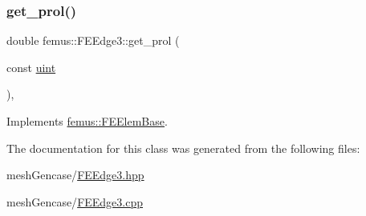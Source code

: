 \subsubsection{\texorpdfstring{get\+\_\+prol()}{get\_prol()}}
{\footnotesize\ttfamily double femus\+::\+F\+E\+Edge3\+::get\+\_\+prol (\begin{DoxyParamCaption}\item[{const \mbox{\hyperlink{_typedefs_8hpp_a91ad9478d81a7aaf2593e8d9c3d06a14}{uint}}}]{ }\end{DoxyParamCaption})\hspace{0.3cm}{\ttfamily [inline]}, {\ttfamily [virtual]}}



Implements \mbox{\hyperlink{classfemus_1_1_f_e_elem_base_ac82326cdc7cb02329c7be9547d56fad4}{femus\+::\+F\+E\+Elem\+Base}}.



The documentation for this class was generated from the following files\+:\begin{DoxyCompactItemize}
\item 
mesh\+Gencase/\mbox{\hyperlink{_f_e_edge3_8hpp}{F\+E\+Edge3.\+hpp}}\item 
mesh\+Gencase/\mbox{\hyperlink{_f_e_edge3_8cpp}{F\+E\+Edge3.\+cpp}}\end{DoxyCompactItemize}
